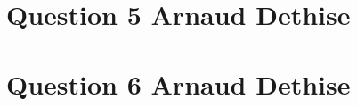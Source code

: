 \documentclass[10pt,a4paper]{article}
\begin{document}
\section*{Question 5 Arnaud Dethise}
\section*{Question 6 Arnaud Dethise}
\end{document}
